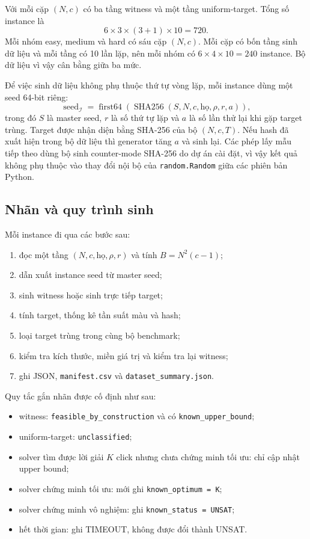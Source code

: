 \documentclass[11pt,a4paper]{article}
\newcommand{\I}{\mathcal{I}}
\begin{document}
Với mỗi cặp $(N,c)$ có ba tầng witness và một tầng uniform-target. Tổng số
instance là
\[
  6\times3\times(3+1)\times10=720.
\]
Mỗi nhóm easy, medium và hard có sáu cặp $(N,c)$. Mỗi cặp có bốn tầng sinh
dữ liệu và mỗi tầng có 10 lần lặp, nên mỗi nhóm có
$6\times4\times10=240$ instance. Bộ dữ liệu vì vậy cân bằng giữa ba mức.

Để việc sinh dữ liệu không phụ thuộc thứ tự vòng lặp, mỗi instance dùng một
seed 64-bit riêng:
\[
  \operatorname{seed}_{\I}
  =\operatorname{first64}\!\left(
  \operatorname{SHA256}(S,N,c,\text{họ},\rho,r,a)\right),
\]
trong đó $S$ là master seed, $r$ là số thứ tự lặp và $a$ là số lần thử lại
khi gặp target trùng. Target được nhận diện bằng SHA-256 của bộ $(N,c,T)$.
Nếu hash đã xuất hiện trong bộ dữ liệu thì generator tăng $a$ và sinh lại.
Các phép lấy mẫu tiếp theo dùng bộ sinh counter-mode SHA-256 do dự án cài
đặt, vì vậy kết quả không phụ thuộc vào thay đổi nội bộ của
\texttt{random.Random} giữa các phiên bản Python.

\subsection{Nhãn và quy trình sinh}

Mỗi instance đi qua các bước sau:

\begin{enumerate}
  \item đọc một tầng $(N,c,\text{họ},\rho,r)$ và tính
        $B=N^2(c-1)$;
  \item dẫn xuất instance seed từ master seed;
  \item sinh witness hoặc sinh trực tiếp target;
  \item tính target, thống kê tần suất màu và hash;
  \item loại target trùng trong cùng bộ benchmark;
  \item kiểm tra kích thước, miền giá trị và kiểm tra lại witness;
  \item ghi JSON, \texttt{manifest.csv} và
        \texttt{dataset\_summary.json}.
\end{enumerate}

Quy tắc gắn nhãn được cố định như sau:

\begin{itemize}
  \item witness: \texttt{feasible\_by\_construction} và có
        \texttt{known\_upper\_bound};
  \item uniform-target: \texttt{unclassified};
  \item solver tìm được lời giải $K$ click nhưng chưa chứng minh tối ưu:
        chỉ cập nhật upper bound;
  \item solver chứng minh tối ưu: mới ghi \texttt{known\_optimum = K};
  \item solver chứng minh vô nghiệm: ghi \texttt{known\_status = UNSAT};
  \item hết thời gian: ghi TIMEOUT, không được đổi thành UNSAT.
\end{itemize}
\end{document}
